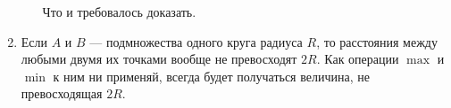 \begin{enumerate}
\begin{enumerate}
	Что и требовалось доказать.

\end{enumerate}

\item Если $A$ и $B$ — подмножества одного круга радиуса $R$, то расстояния между любыми двумя их точками вообще не превосходят $2R$. Как операции $\max$ и $\min$ к ним ни применяй, всегда будет получаться величина, не превосходящая $2R$.
\end{enumerate}